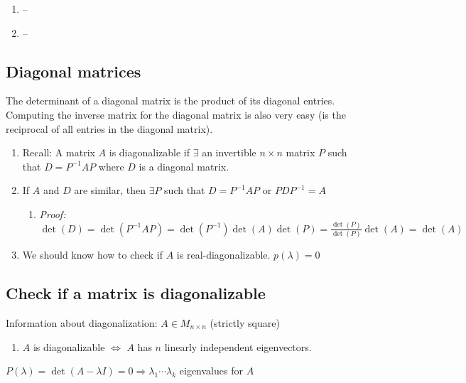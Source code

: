 \documentclass[12pt]{article}
\theoremstyle{plain}
\theoremstyle{remark}
\theoremstyle{definition}
\begin{document}
\begin{enumerate}
\def\labelenumi{\arabic{enumi}.}
\setcounter{enumi}{3}
\item
  --
\item
  --
\end{enumerate}


\subsection{Diagonal matrices}

The determinant of a diagonal matrix is the product of its diagonal
entries. Computing the inverse matrix for the diagonal matrix is also
very easy (is the reciprocal of all entries in the diagonal matrix).

\begin{enumerate}
\def\labelenumi{\arabic{enumi}.}
\item
  Recall: A matrix \(A\) is diagonalizable if \(\exists\) an invertible
  \(n \times n\) matrix \(P\) such that \(D = P^{- 1}AP\) where
  \(D\) is a diagonal matrix.
\item
  If \(A\) and \(D\) are similar, then \(\exists P\) such that
  \(D = P^{- 1}AP\) or \(PDP^{- 1} = A\)

  \begin{enumerate}
  \def\labelenumii{\alph{enumii}.}
  \item
    \emph{Proof:}
    \(\det(D) = \det\left( P^{- 1}AP \right) = \det\left( P^{- 1} \right)\det(A)\det(P) = \frac{\det(P)}{\det(P)}\det(A) = \det(A)\)
  \end{enumerate}
\item
  We should know how to check if \(A\) is real-diagonalizable.
  \(p(\lambda) = 0\)
\end{enumerate}


\subsection{Check if a matrix is
diagonalizable}

Information about diagonalization: \(A \in M_{n \times n}\) (strictly
square)

\begin{enumerate}
\def\labelenumi{\arabic{enumi}.}
\item
  \(A\) is diagonalizable \(\Leftrightarrow\) \(A\) has \(n\) linearly
  independent eigenvectors.
\end{enumerate}

\(P(\lambda) = \det(A - \lambda I) = 0 \Rightarrow \lambda_{1}\cdots\lambda_{k}\)
eigenvalues for \(A\)
\end{document}
